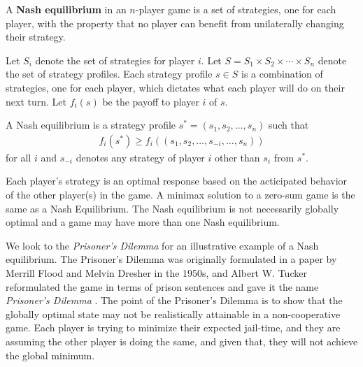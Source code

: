 \begin{definition}
  A \textbf{Nash equilibrium} in an $n$-player game is a set of
  strategies, one for each player, with the property that no player
  can benefit from unilaterally changing their strategy.

  Let $S_i$ denote the set of strategies for player $i$. Let
  $S = S_1 \times S_2 \times \cdots \times S_n$ denote the set of
  strategy profiles.  Each strategy profile $s \in S$ is a combination
  of strategies, one for each player, which dictates what each player
  will do on their next turn.  Let $f_i(s)$ be the payoff to player
  $i$ of $s$.

  A Nash equilibrium is a strategy profile
  $s^* = (s_1, s_2, \dots, s_n)$ such that
  \begin{align}
  f_i(s^*) \geq f_i((s_1, s_2, \dots, s_{-i}, \dots, s_n))
  \end{align}
  for all $i$ and $s_{-i}$ denotes any strategy of player $i$ other
  than $s_i$ from $s^*$.
\end{definition}

\begin{remark}
  Each player's strategy is an optimal response based on the
  acticipated behavior of the other player(s) in the game.  A minimax
  solution to a zero-sum game is the same as a Nash Equilibrium. The
  Nash equilibrium is not necessarily globally optimal and a game may
  have more than one Nash equilibrium.
\end{remark}


We look to the \textit{Prisoner's Dilemma} for an illustrative example
of a Nash equilibrium. The Prisoner's Dilemma was originally
formulated in a paper by Merrill Flood and Melvin Dresher in the
1950s, and Albert W. Tucker reformulated the game in terms of prison
sentences and gave it the name \textit{Prisoner's Dilemma}
\cite{ref:poundstone}. The point of the Prisoner's Dilemma is to show
that the globally optimal state may not be realistically attainable in
a non-cooperative game. Each player is trying to minimize their
expected jail-time, and they are assuming the other player is doing
the same, and given that, they will not achieve the global minimum.

